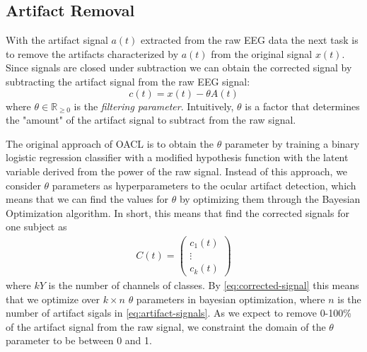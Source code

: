 \subsection{Artifact Removal}
With the artifact signal $a(t)$ extracted from the raw EEG data the next task is to remove the artifacts characterized by $a(t)$ from the original signal $x(t)$. Since signals are closed under subtraction we can obtain the corrected signal by subtracting the artifact signal from the raw EEG signal:
\begin{equation}\label{eq:corrected-signal}
c(t) = x(t) - \theta A(t)
\end{equation}
where $\theta \in \mathbb{R}_{\geq 0}$ is the \emph{filtering parameter}. Intuitively, $\theta$ is a factor that determines the "amount" of the artifact signal to subtract from the raw signal. 

The original approach of OACL is to obtain the $\theta$ parameter by training a binary logistic regression classifier with a modified hypothesis function with the latent variable derived from the power of the raw signal. Instead of this approach, we consider $\theta$ parameters as hyperparameters to the ocular artifact detection, which means that we can find the values for $\theta$ by optimizing them through the Bayesian Optimization algorithm. In short, this means that find the corrected signals for one subject as
\begin{align}\label{eq:corrected-signal}
C(t)=  \begin{pmatrix}
c_1(t) \\
\vdots  \\
c_{k}(t) 
\end{pmatrix}
\end{align}
where $kY$ is the number of channels of classes. By \cref{eq:corrected-signal} this means that we optimize over $k \times n$ $\theta$ parameters in bayesian optimization, where $n$ is the number of artifact sigals in \cref{eq:artifact-signals}. As we expect to remove 0-100\% of the artifact signal from the raw signal, we constraint the domain of the $\theta$ parameter to be between 0 and 1.  

